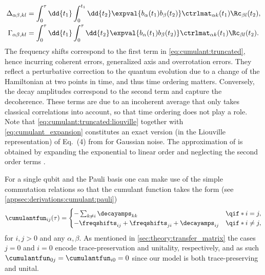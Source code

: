 \begin{align}
    \Delta_{\alpha\beta,kl} &= \int_0^\tau\dd{t_1}\int_0^{t_1}\dd{t_2}\expval{b_\alpha(t_1) b_\beta(t_2)}\ctrlmat_{\alpha k}(t_1)\Rc_{\beta l}(t_2), \label{eq:frequency_shift:time} \\
    \Gamma_{\alpha\beta,kl} &= \int_0^\tau\dd{t_1}\int_0^\tau\dd{t_2}\expval{b_\alpha(t_1) b_\beta(t_2)}\ctrlmat_{\alpha k}(t_1)\Rc_{\beta l}(t_2).  \label{eq:decay_amplitudes:time}
\end{align}
The frequency shifts \freqshifts correspond to the first term in \cref{eq:cumulant:truncated}, hence incurring coherent errors, \ie generalized axis and overrotation errors. They reflect a perturbative correction to the quantum evolution due to a change of the Hamiltonian at two points in time, and thus time ordering matters. Conversely, the decay amplitudes \decayamps correspond to the second term and capture the decoherence. These terms are due to an incoherent average that only takes classical correlations into account, so that time ordering does not play a role. Note that \cref{eq:cumulant:truncated:liouville} together with \cref{eq:cumulant_expansion} constitutes an exact version (in the Liouville representation) of Eq.~(4) from  for Gaussian noise. The approximation of  is obtained by expanding the exponential to linear order and neglecting the second order terms \freqshifts.

For a single qubit and \basis the Pauli basis one can make use of the simple commutation relations so that the cumulant function takes the form (see \cref{appsec:derivations:cumulant:pauli})
\begin{equation}\label{eq:cumulant:truncated:liouville:pauli}
    \cumulantfun_{ij}(\tau) = \begin{cases}
        - \sum_{k\neq i}\decayamps_{kk}                         &\qif* i = j,   \\
        - \freqshifts_{ij} + \freqshifts_{ji} + \decayamps_{ij} &\qif* i\neq j,
    \end{cases}
\end{equation}
for $i,j > 0$ and any $\alpha,\beta$. As mentioned in \cref{sec:theory:transfer_matrix} the cases $j = 0$ and $i = 0$ encode trace-preservation and unitality, respectively, and as such $\cumulantfun_{0j} = \cumulantfun_{i0} = 0$ since our model is both trace-preserving and unital.

